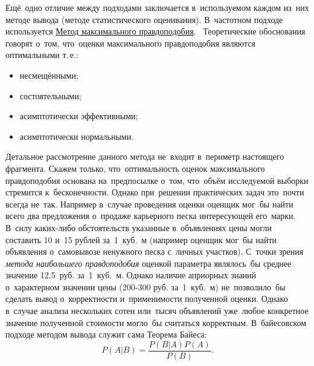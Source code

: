 \documentclass[]{scrartcl}
\begin{document}
Ещё~одно отличие между подходами заключается в~используемом каждом из~них методе вывода (методе статистического оценивания). В~частотном подходе используется \href{http://www.machinelearning.ru/wiki/index.php?title=Метод_наибольшего_правдоподобия}{Метод максимального правдоподобия}.~\cite{MLRU:max-likehood-method} Теоретические обоснования говорят о~том, что~оценки максимального правдоподобия являются оптимальными т.\,е.:
	\begin{itemize}
		\item несмещёнными;
		\item состоятельными;
		\item асимптотически эффективными;
		\item асимптотически нормальными.
	\end{itemize}
Детальное рассмотрение данного метода не~входит в~периметр настоящего фрагмента. Скажем только, что~оптимальность оценок максимального правдоподобия основана на~предпосылке о~том, что~объём исследуемой выборки стремится к~бесконечности. Однако при~решении практических задач это~почти всегда не~так. Например в~случае проведения оценки оценщик мог~бы найти всего два предложения о~продаже карьерного песка интересующей его~марки. В~силу каких-либо обстоятельств указанные в~объявлениях цены могли составить 10 и~15 рублей за~1~куб.~м (например оценщик мог~бы найти объявления о~самовывозе ненужного песка с~личных участков). С~точки зрения \emph{метода наибольшего правдоподобия} оценкой параметра являлось~бы среднее значение 12.5~руб. за~1~куб.~м. Однако наличие априорных знаний о~характерном значении цены (200-300 руб. за~1~куб.~м) не~позволило~бы сделать вывод о~корректности и~применимости полученной оценки. Однако в~случае анализа нескольких сотен или~тысяч объявлений уже~любое конкретное значение полученной стоимости могло~бы считаться корректным. В~байесовском подходе методом вывода служит сама Теорема Байеса:
\begin{equation}\label{Bayes-Theorem}
P(A|B) = \frac{P(B|A)P(A)}{P(B)}.
\end{equation}
\end{document}
